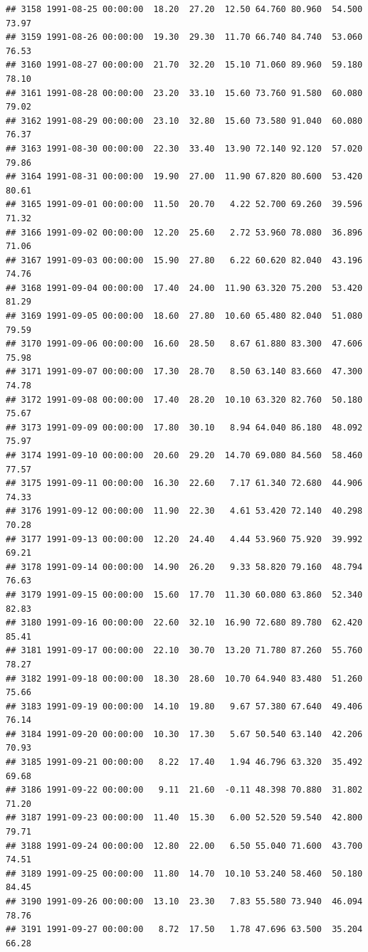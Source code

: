 \documentclass{article}\usepackage{graphicx, color}
\makeatletter
\newenvironment{kframe}{%
 \def\at@end@of@kframe{}%
 \ifinner\ifhmode%
  \def\at@end@of@kframe{\end{minipage}}%
  \begin{minipage}{\columnwidth}%
 \fi\fi%
 \def\FrameCommand##1{\hskip\@totalleftmargin \hskip-\fboxsep
 \colorbox{shadecolor}{##1}\hskip-\fboxsep
     \hskip-\linewidth \hskip-\@totalleftmargin \hskip\columnwidth}%
 \MakeFramed {\advance\hsize-\width
   \@totalleftmargin\z@ \linewidth\hsize
   \@setminipage}}%
 {\par\unskip\endMakeFramed%
 \at@end@of@kframe}
\newenvironment{knitrout}{}{} %
\makeatother
\begin{document}
\begin{knitrout}
\begin{kframe}
\begin{verbatim}
## 3158 1991-08-25 00:00:00  18.20  27.20  12.50 64.760 80.960  54.500  73.97
## 3159 1991-08-26 00:00:00  19.30  29.30  11.70 66.740 84.740  53.060  76.53
## 3160 1991-08-27 00:00:00  21.70  32.20  15.10 71.060 89.960  59.180  78.10
## 3161 1991-08-28 00:00:00  23.20  33.10  15.60 73.760 91.580  60.080  79.02
## 3162 1991-08-29 00:00:00  23.10  32.80  15.60 73.580 91.040  60.080  76.37
## 3163 1991-08-30 00:00:00  22.30  33.40  13.90 72.140 92.120  57.020  79.86
## 3164 1991-08-31 00:00:00  19.90  27.00  11.90 67.820 80.600  53.420  80.61
## 3165 1991-09-01 00:00:00  11.50  20.70   4.22 52.700 69.260  39.596  71.32
## 3166 1991-09-02 00:00:00  12.20  25.60   2.72 53.960 78.080  36.896  71.06
## 3167 1991-09-03 00:00:00  15.90  27.80   6.22 60.620 82.040  43.196  74.76
## 3168 1991-09-04 00:00:00  17.40  24.00  11.90 63.320 75.200  53.420  81.29
## 3169 1991-09-05 00:00:00  18.60  27.80  10.60 65.480 82.040  51.080  79.59
## 3170 1991-09-06 00:00:00  16.60  28.50   8.67 61.880 83.300  47.606  75.98
## 3171 1991-09-07 00:00:00  17.30  28.70   8.50 63.140 83.660  47.300  74.78
## 3172 1991-09-08 00:00:00  17.40  28.20  10.10 63.320 82.760  50.180  75.67
## 3173 1991-09-09 00:00:00  17.80  30.10   8.94 64.040 86.180  48.092  75.97
## 3174 1991-09-10 00:00:00  20.60  29.20  14.70 69.080 84.560  58.460  77.57
## 3175 1991-09-11 00:00:00  16.30  22.60   7.17 61.340 72.680  44.906  74.33
## 3176 1991-09-12 00:00:00  11.90  22.30   4.61 53.420 72.140  40.298  70.28
## 3177 1991-09-13 00:00:00  12.20  24.40   4.44 53.960 75.920  39.992  69.21
## 3178 1991-09-14 00:00:00  14.90  26.20   9.33 58.820 79.160  48.794  76.63
## 3179 1991-09-15 00:00:00  15.60  17.70  11.30 60.080 63.860  52.340  82.83
## 3180 1991-09-16 00:00:00  22.60  32.10  16.90 72.680 89.780  62.420  85.41
## 3181 1991-09-17 00:00:00  22.10  30.70  13.20 71.780 87.260  55.760  78.27
## 3182 1991-09-18 00:00:00  18.30  28.60  10.70 64.940 83.480  51.260  75.66
## 3183 1991-09-19 00:00:00  14.10  19.80   9.67 57.380 67.640  49.406  76.14
## 3184 1991-09-20 00:00:00  10.30  17.30   5.67 50.540 63.140  42.206  70.93
## 3185 1991-09-21 00:00:00   8.22  17.40   1.94 46.796 63.320  35.492  69.68
## 3186 1991-09-22 00:00:00   9.11  21.60  -0.11 48.398 70.880  31.802  71.20
## 3187 1991-09-23 00:00:00  11.40  15.30   6.00 52.520 59.540  42.800  79.71
## 3188 1991-09-24 00:00:00  12.80  22.00   6.50 55.040 71.600  43.700  74.51
## 3189 1991-09-25 00:00:00  11.80  14.70  10.10 53.240 58.460  50.180  84.45
## 3190 1991-09-26 00:00:00  13.10  23.30   7.83 55.580 73.940  46.094  78.76
## 3191 1991-09-27 00:00:00   8.72  17.50   1.78 47.696 63.500  35.204  66.28

\end{verbatim}
\end{kframe}
\end{knitrout}
\end{document}
